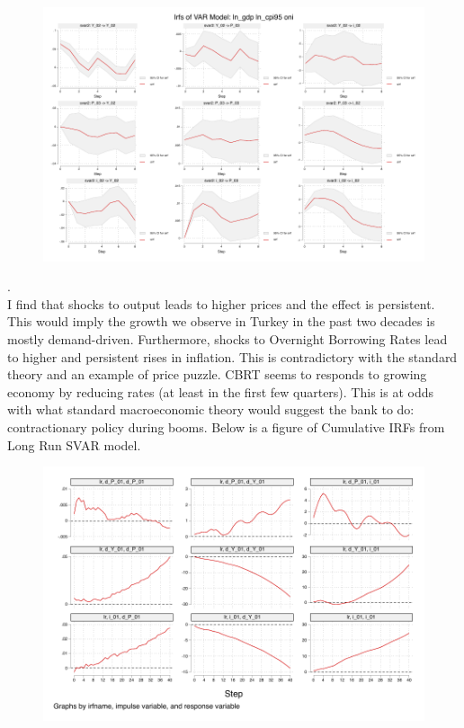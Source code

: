 \documentclass{article}
\begin{document}
\begin{figure}[H]
    \centering
    \includegraphics[width=\linewidth-2cm]{turkey_taylor/svar2.pdf}
\end{figure}
    {\tiny .}\\
    I find that shocks to output leads to higher prices and the effect is persistent. This would imply the growth we observe in Turkey in the past two decades is mostly demand-driven. Furthermore, shocks to Overnight Borrowing Rates lead to higher and persistent rises in inflation. This is contradictory with the standard theory and an example of price puzzle. CBRT seems to responds to growing economy by reducing rates (at least in the first few quarters). This is at odds with what standard macroeconomic theory would suggest the bank to do: contractionary policy during booms. Below is a figure of Cumulative IRFs from Long Run SVAR model.
    
    
\begin{figure}[H]
    \centering
    \includegraphics[width=\linewidth-2cm]{turkey_taylor/lvar_cumulative.pdf}
\end{figure}
\end{document}
